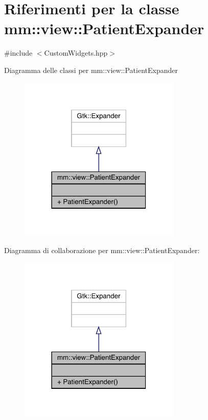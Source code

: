 \hypertarget{classmm_1_1view_1_1_patient_expander}{}\section{Riferimenti per la classe mm\+:\+:view\+:\+:Patient\+Expander}
\label{classmm_1_1view_1_1_patient_expander}


{\ttfamily \#include $<$Custom\+Widgets.\+hpp$>$}



Diagramma delle classi per mm\+:\+:view\+:\+:Patient\+Expander
\nopagebreak
\begin{figure}[H]
\begin{center}
\leavevmode
\includegraphics[width=218pt]{d0/d9d/classmm_1_1view_1_1_patient_expander__inherit__graph}
\end{center}
\end{figure}


Diagramma di collaborazione per mm\+:\+:view\+:\+:Patient\+Expander\+:
\nopagebreak
\begin{figure}[H]
\begin{center}
\leavevmode
\includegraphics[width=218pt]{d2/d15/classmm_1_1view_1_1_patient_expander__coll__graph}
\end{center}
\end{figure}
